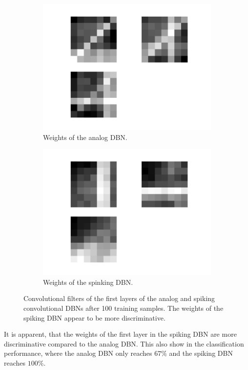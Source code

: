  \begin{figure}[h!]
	\centering
	\begin{subfigure}[t]{.45\textwidth}
  		\centering
  		\includegraphics[width=.9\linewidth]{imgs/vs/w_rbm.png}
  		\caption{Weights of the analog DBN.}
  		\label{fig:sub1}
	\end{subfigure}%
	\begin{subfigure}[t]{.45\textwidth}
  		\centering
  		\includegraphics[width=.9\linewidth]{imgs/vs/w_spike.png}
  		\caption{Weights of the spinking DBN.}
  		\label{fig:sub2}
	\end{subfigure}
	\caption{Convolutional filters of the first layers of the analog and spiking convolutional DBNs after 100 training samples. The weights of the spiking DBN appear to be more discriminative.}
	\label{fig:stripes}
\end{figure}

It is apparent, that the weights of the first layer in the spiking DBN are more discriminative compared to the analog DBN.
This also show in the classification performance, where the analog DBN only reaches $67 \%$ and the spiking DBN reaches $100 \%$.

